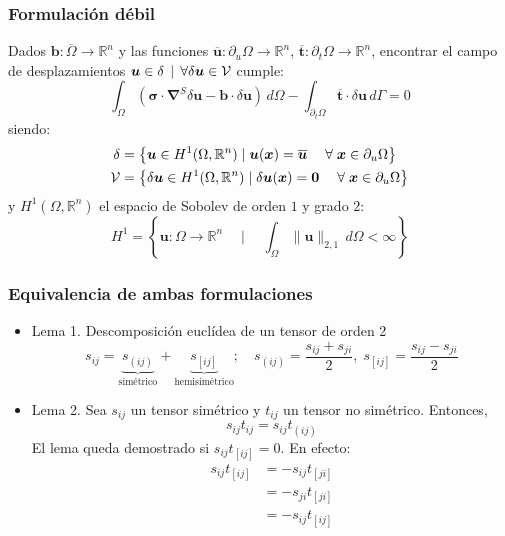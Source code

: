 \documentclass[handout]{beamer}
\newcommand{\norm}[1]{\lVert #1 \rVert}
\begin{document}
\begin{frame}
\frametitle{Formulación débil}
Dados $\bm{b}:\overline{\Omega}\rightarrow \mathbb{R}^n$ y las funciones
$\overline{\bm{u}}:\partial_u \Omega \rightarrow \mathbb{R}^n$,
$\overline{\bm{t}}:\partial_t \Omega \rightarrow \mathbb{R}^n$,
encontrar el campo de
desplazamientos $\bm{u}\in \delta\,\mid \, \forall \delta \bm{u} \in {\cal V}$
cumple:
\begin{equation}
\int_{\Omega}\left( \bm{\sigma}\cdot \bm{\nabla}^{S}\delta \bm{u}
-\bm{b} \cdot \delta \bm{u} \right) \, d \Omega
-\int_{\partial_t \Omega} \overline{\bm{t}}\cdot
\delta \bm{u} \, d \Gamma =0 \label{formdeb}
\end{equation}
siendo:
\begin{align}
\delta&=\left\{
\bm{u} \in H^1(\Omega,\mathbb{R}^n) \mid \bm{u}(\bm{x})=\overline{\bm{u}}
\; \quad \forall \; \bm{x} \in \partial_u \Omega \right\} \label{trial} \\
{\cal V}&=\left\{
\delta \bm{u} \in H^1(\Omega,\mathbb{R}^n) \mid \delta \bm{u}(\bm{x})=\bm
{0} \; \quad \forall \; \bm{x} \in \partial_u \Omega \right\} \label{weight}
\end{align}
y $H^1(\Omega,\mathbb{R}^n)$ el espacio de Sobolev de orden $1$ y grado $2$:
$$
H^1=\left\{ \bm{u}:\Omega \rightarrow \mathbb{R}^n \quad \mid \quad
\int_{\Omega} \norm{\bm{u}}_{2,1} \, d\Omega <\infty \right\}
$$
\end{frame}
\begin{frame}
\frametitle{Equivalencia de ambas formulaciones}
\begin{itemize}
\item Lema 1. Descomposición euclídea de un tensor de orden 2
\begin{equation*}
s_{ij}=\underbrace{s_{(ij)}}_{\textrm{simétrico}}+
       \underbrace{s_{[ij]}}_{\textrm{hemisimétrico}};
\quad
s_{(ij)}=\frac{s_{ij}+s_{ji}}{2},
\;
s_{[ij]}=\frac{s_{ij}-s_{ji}}{2}
\end{equation*}
\item Lema 2. Sea $s_{ij}$ un tensor simétrico y $t_{ij}$ un tensor no 
simétrico. Entonces,
$$
s_{ij} t_{ij}=s_{ij} t_{(ij)}
$$
El lema queda demostrado si $s_{ij} t_{[ij]}=0$. En efecto:
\begin{align*}
s_{ij} t_{[ij]}&=-s_{ij} t_{[ji]} \\
\mbox{}        &=-s_{ji} t_{[ji]} \\
\mbox{}        &=-s_{ij} t_{[ij]}
\end{align*}
\end{itemize}
\end{frame}
\end{document}
